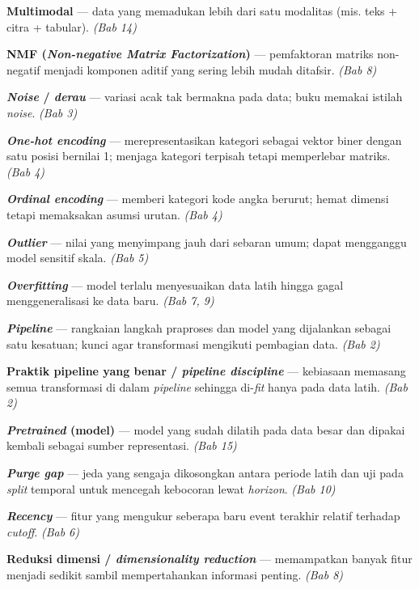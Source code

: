 \textbf{Multimodal} --- data yang memadukan lebih dari satu modalitas (mis. teks +
citra + tabular). \emph{(Bab 14)}


\textbf{NMF (\emph{Non-negative Matrix Factorization})} --- pemfaktoran matriks non-negatif
menjadi komponen aditif yang sering lebih mudah ditafsir. \emph{(Bab 8)}

\textbf{\emph{Noise} / \emph{derau}} --- variasi acak tak bermakna pada data; buku memakai istilah
\emph{noise}. \emph{(Bab 3)}


\textbf{\emph{One-hot encoding}} --- merepresentasikan kategori sebagai vektor biner dengan
satu posisi bernilai 1; menjaga kategori terpisah tetapi memperlebar matriks.
\emph{(Bab 4)}

\textbf{\emph{Ordinal encoding}} --- memberi kategori kode angka berurut; hemat dimensi tetapi
memaksakan asumsi urutan. \emph{(Bab 4)}

\textbf{\emph{Outlier}} --- nilai yang menyimpang jauh dari sebaran umum; dapat mengganggu
model sensitif skala. \emph{(Bab 5)}

\textbf{\emph{Overfitting}} --- model terlalu menyesuaikan data latih hingga gagal
menggeneralisasi ke data baru. \emph{(Bab 7, 9)}


\textbf{\emph{Pipeline}} --- rangkaian langkah praproses dan model yang dijalankan sebagai satu
kesatuan; kunci agar transformasi mengikuti pembagian data. \emph{(Bab 2)}

\textbf{Praktik pipeline yang benar / \emph{pipeline discipline}} --- kebiasaan memasang
semua transformasi di dalam \emph{pipeline} sehingga di-\emph{fit} hanya pada data latih.
\emph{(Bab 2)}

\textbf{\emph{Pretrained} (model)} --- model yang sudah dilatih pada data besar dan dipakai
kembali sebagai sumber representasi. \emph{(Bab 15)}

\textbf{\emph{Purge gap}} --- jeda yang sengaja dikosongkan antara periode latih dan uji pada
\emph{split} temporal untuk mencegah kebocoran lewat \emph{horizon}. \emph{(Bab 10)}


\textbf{\emph{Recency}} --- fitur yang mengukur seberapa baru event terakhir relatif terhadap
\emph{cutoff}. \emph{(Bab 6)}

\textbf{Reduksi dimensi / \emph{dimensionality reduction}} --- memampatkan banyak fitur
menjadi sedikit sambil mempertahankan informasi penting. \emph{(Bab 8)}

